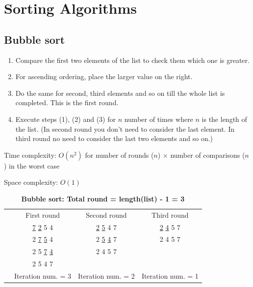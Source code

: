 \documentclass[a4paper,11pt]{book}
\begin{document}
\chapter{Sorting Algorithms}

\section{Bubble sort}

\begin{enumerate}
	\item Compare the first two elements of the list to check them which one is greater.
	\item For ascending ordering, place the larger value on the right.
	\item Do the same for second, third elements and so on till the whole list is completed. This is the first round.
	\item Execute steps (1), (2) and (3) for $n$ number of times where $n$ is the length of the list. (In second round you don't need to consider the last element. In third round no need to consider the last two elements and so on.)
\end{enumerate}

\noindent Time complexity: $O(n^2)$ for number of rounds ($n$) $\times$ number of comparisons ($n$) in the worst case

\noindent Space complexity: $O(1)$

\begin{table}[ht]
	\label{Bubble sort}
	\caption{\textbf{Bubble sort: Total round = length(list) - 1 = 3}}
	\vspace{2mm}
	\centering
	\begin{tabular}{cccc}
		&{First round}  &{Second round}  &{Third round}   \\
		&\underline{7} \underline{2} 5 4  &\underline{2} \underline{5} 4 7&\underline{2} \underline{4} 5 7\\
		
		&2 \underline{7} \underline{5} 4&2 \underline{5} \underline{4} 7  &2 4 5 7   \\
		&2 5 \underline{7} \underline{4}  &2 4 5 7 &   \\
		&2 5 4 7  & &\\
		&Iteration num. = 3 &Iteration num. = 2 &Iteration num. = 1 
	\end{tabular}
\end{table}
\end{document}
